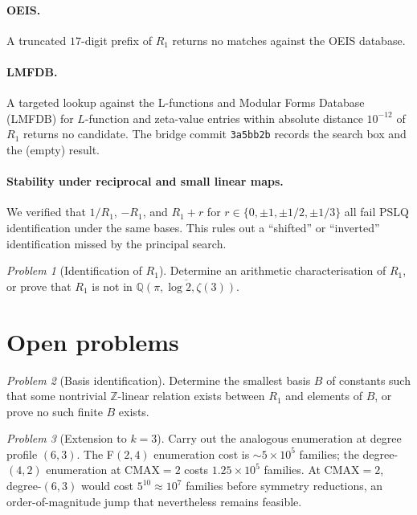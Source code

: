 \documentclass[11pt,a4paper]{amsart}
\theoremstyle{definition}
\theoremstyle{remark}
\newtheorem{problem}{Problem}
\begin{document}
\paragraph{OEIS.}
A truncated $17$-digit prefix of $R_1$ returns no matches against the
OEIS database.

\paragraph{LMFDB.}
A targeted lookup against the L-functions and Modular Forms Database
(LMFDB) for $L$-function and zeta-value entries within absolute
distance $10^{-12}$ of $R_1$ returns no candidate.  The bridge commit
\texttt{3a5bb2b} records the search box and the (empty) result.

\paragraph{Stability under reciprocal and small linear maps.}
We verified that $1/R_1$, $-R_1$, and $R_1 + r$ for
$r \in \{0, \pm 1, \pm 1/2, \pm 1/3\}$ all fail PSLQ
identification under the same bases.  This rules out a
``shifted'' or ``inverted'' identification missed by the principal
search.

\begin{problem}[Identification of $R_1$]\label{prob:R1}
Determine an arithmetic characterisation of $R_1$, or prove that $R_1$
is not in $\overline{\mathbb{Q}(\pi,\log 2,\zeta(3))}$.
\end{problem}

\section{Open problems}\label{sec:open}

\begin{problem}[Basis identification]
Determine the smallest basis $B$ of constants such that some
nontrivial $\mathbb{Z}$-linear relation exists between $R_1$ and
elements of $B$, or prove no such finite $B$ exists.
\end{problem}

\begin{problem}[Extension to $k=3$]
Carry out the analogous enumeration at degree profile $(6,3)$.  The
F$(2,4)$ enumeration cost is $\sim 5\times 10^5$ families; the
degree-$(4,2)$ enumeration at $\mathrm{CMAX}=2$ costs $1.25\times 10^5$
families.  At $\mathrm{CMAX}=2$, degree-$(6,3)$ would cost $5^{10} \approx
10^7$ families before symmetry reductions, an order-of-magnitude jump
that nevertheless remains feasible.
\end{problem}
\end{document}
